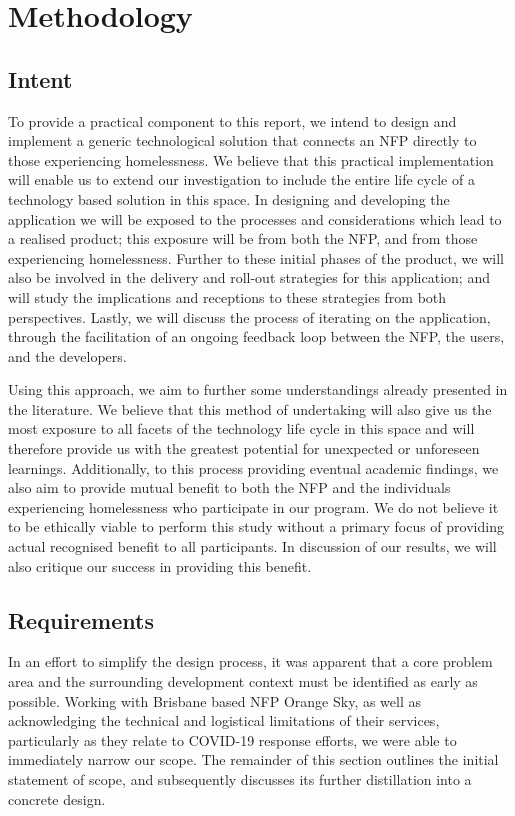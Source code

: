 \chapter{Methodology}

\section{Intent}

To provide a practical component to this report, we intend to design and implement a generic technological solution that connects an NFP directly to those experiencing homelessness. We believe that this practical implementation will enable us to extend our investigation to include the entire life cycle of a technology based solution in this space. In designing and developing the application we will be exposed to the processes and considerations which lead to a realised product; this exposure will be from both the NFP, and from those experiencing homelessness. Further to these initial phases of the product, we will also be involved in the delivery and roll-out strategies for this application; and will study the implications and receptions to these strategies from both perspectives. Lastly, we will discuss the process of iterating on the application, through the facilitation of an ongoing feedback loop between the NFP, the users, and the developers.

Using this approach, we aim to further some understandings already presented in the literature. We believe that this method of undertaking will also give us the most exposure to all facets of the technology life cycle in this space and will therefore provide us with the greatest potential for unexpected or unforeseen learnings. Additionally, to this process providing eventual academic findings, we also aim to provide mutual benefit to both the NFP and the individuals experiencing homelessness who participate in our program. We do not believe it to be ethically viable to perform this study without a primary focus of providing actual recognised benefit to all participants. In discussion of our results, we will also critique our success in providing this benefit.

\section{Requirements}

In an effort to simplify the design process, it was apparent that a core problem area and the surrounding development context must be identified as early as possible. Working with Brisbane based NFP Orange Sky, as well as acknowledging the technical and logistical limitations of their services, particularly as they relate to COVID-19 response efforts, we were able to immediately narrow our scope. The remainder of this section outlines the initial statement of scope, and subsequently discusses its further distillation into a concrete design.

